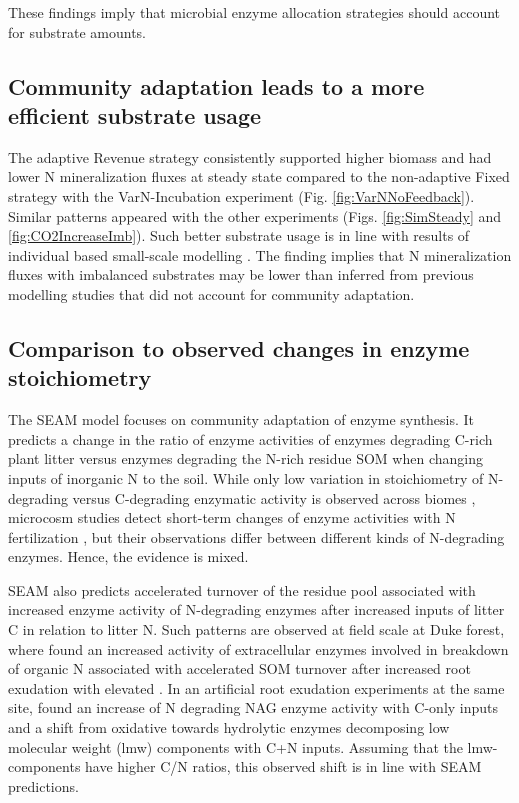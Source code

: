 These findings imply that microbial enzyme allocation strategies should
account for substrate amounts.

\subsection{Community adaptation leads to a more efficient substrate usage}
The adaptive Revenue strategy consistently supported higher biomass and had
lower N mineralization fluxes at steady state compared to the non-adaptive
Fixed strategy with the VarN-Incubation experiment (Fig.
\ref{fig:VarNNoFeedback}). Similar patterns appeared with the other experiments
(Figs. \ref{fig:SimSteady} and \ref{fig:CO2IncreaseImb}). Such better substrate
usage is in line with results of individual based small-scale modelling
\citep{Kaiser14}.
The finding implies that N mineralization fluxes with imbalanced substrates may
be lower than inferred from previous modelling studies that did not account for
community adaptation.

\subsection{Comparison to observed changes in enzyme stoichiometry}

The SEAM model focuses on community adaptation of enzyme synthesis. It predicts
a change in the ratio of enzyme activities of enzymes degrading C-rich plant
litter versus enzymes degrading the N-rich residue SOM when changing inputs of
inorganic N to the soil.
While only low variation in stoichiometry of N-degrading versus C-degrading
enzymatic activity is observed across biomes \citep{Sinsabaugh09}, microcosm
studies detect short-term changes of enzyme activities with N fertilization
\citep{Kumar16}, but their observations differ between different kinds of
N-degrading enzymes. Hence, the evidence is mixed.

SEAM also predicts accelerated turnover of the residue pool associated with
increased enzyme activity of N-degrading enzymes after increased inputs of
litter C in relation to litter N.
Such patterns are observed at field scale at Duke forest, where
\citet{Phillips11} found an increased activity of extracellular enzymes involved
in breakdown of organic N associated with accelerated SOM turnover after
increased root exudation with elevated . In an artificial
root exudation experiments at the same site, \citet{Drake13} found an increase of N
degrading NAG enzyme activity with C-only inputs and a shift from oxidative
towards hydrolytic enzymes decomposing low molecular weight (lmw) components
with C+N inputs.
Assuming that the lmw-components have higher C/N ratios, this observed shift
is in line with SEAM predictions.

